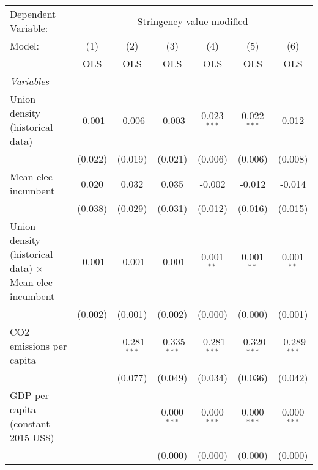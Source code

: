 
\begingroup
\centering
\begin{tabular}{lcccccc}
   \toprule
   Dependent Variable: & \multicolumn{6}{c}{Stringency value modified}\\
   Model:                                                        & (1)     & (2)            & (3)            & (4)            & (5)            & (6)\\  
                                                                 &  OLS    & OLS            & OLS            & OLS            & OLS            & OLS\\  
   \midrule
   \emph{Variables}\\
   Union density (historical data)                               & -0.001  & -0.006         & -0.003         & 0.023$^{***}$  & 0.022$^{***}$  & 0.012\\   
                                                                 & (0.022) & (0.019)        & (0.021)        & (0.006)        & (0.006)        & (0.008)\\   
   Mean elec incumbent                                           & 0.020   & 0.032          & 0.035          & -0.002         & -0.012         & -0.014\\   
                                                                 & (0.038) & (0.029)        & (0.031)        & (0.012)        & (0.016)        & (0.015)\\   
   Union density (historical data) $\times$ Mean elec incumbent  & -0.001  & -0.001         & -0.001         & 0.001$^{**}$   & 0.001$^{**}$   & 0.001$^{**}$\\   
                                                                 & (0.002) & (0.001)        & (0.002)        & (0.000)        & (0.000)        & (0.001)\\   
   CO2 emissions per capita                                      &         & -0.281$^{***}$ & -0.335$^{***}$ & -0.281$^{***}$ & -0.320$^{***}$ & -0.289$^{***}$\\   
                                                                 &         & (0.077)        & (0.049)        & (0.034)        & (0.036)        & (0.042)\\   
   GDP per capita (constant 2015 US\$)                           &         &                & 0.000$^{***}$  & 0.000$^{***}$  & 0.000$^{***}$  & 0.000$^{***}$\\   
                                                                 &         &                & (0.000)        & (0.000)        & (0.000)        & (0.000)\\   

\end{tabular}
